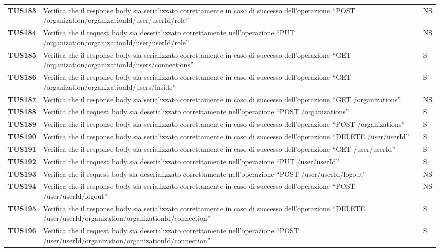 \documentclass[../../piano-di-qualifica.tex]{subfiles}
\begin{document}
\begin{longtable}[H]{>{\centering\bfseries}m{3cm} >{}m{10cm} >{\centering\arraybackslash}m{3cm}}
  TUS183 & Verifica che il response body sia serializzato correttamente in caso di successo dell'operazione ``POST /organization/{organizationId}/user/{userId}/role'' & NS \\
  TUS184 & Verifica che il request body sia deserializzato correttamente nell'operazione ``PUT /organization/{organizationId}/user/{userId}/role'' & NS \\
  TUS185 & Verifica che il response body sia serializzato correttamente in caso di successo dell'operazione ``GET /organization/{organizationId}/users/connections'' & S \\
  TUS186 & Verifica che il response body sia serializzato correttamente in caso di successo dell'operazione ``GET /organization/{organizationId}/users/inside'' & S \\
  TUS187 & Verifica che il response body sia serializzato correttamente in caso di successo dell'operazione ``GET /organizations'' & NS \\
  TUS188 & Verifica che il request body sia deserializzato correttamente nell'operazione ``POST /organizations'' & S \\
  TUS189 & Verifica che il response body sia serializzato correttamente in caso di successo dell'operazione ``POST /organizations'' & S \\
  TUS190 & Verifica che il response body sia serializzato correttamente in caso di successo dell'operazione ``DELETE /user/{userId}'' & S \\
  TUS191 & Verifica che il response body sia serializzato correttamente in caso di successo dell'operazione ``GET /user/{userId}'' & S \\
  TUS192 & Verifica che il request body sia deserializzato correttamente nell'operazione ``PUT /user/{userId}'' & S \\
  TUS193 & Verifica che il request body sia deserializzato correttamente nell'operazione ``POST /user/{userId}/logout'' & NS \\
  TUS194 & Verifica che il response body sia serializzato correttamente in caso di successo dell'operazione ``POST /user/{userId}/logout'' & NS \\
  TUS195 & Verifica che il response body sia serializzato correttamente in caso di successo dell'operazione ``DELETE /user/{userId}/organization/{organizationId}/connection'' & S \\
  TUS196 & Verifica che il request body sia deserializzato correttamente nell'operazione ``POST /user/{userId}/organization/{organizationId}/connection'' & S \\

\end{longtable}
\end{document}
